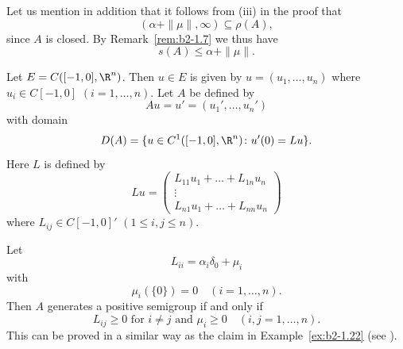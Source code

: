 Let us mention in addition that it follows from \upshape(iii) in the proof that 
%
\[
	(\alpha + \|\mu\|, \infty) \subseteq \rho(A) ,
\]
%
since $A$ is closed.
By Remark~\ref{rem:b2-1.7} we thus have
\begin{equation}\label{eq:b2-1.14}
s(A) \leq \alpha + \|\mu\|.
\end{equation}
\begin{example}\label{ex:b2-1.23}
Let $E = C([-1,0],\R^{n})$.
Then $u \in E$ is given by $u = (u_{1},\ldots,u_{n})$ where $u_{i} \in C[-1,0]$ $(i=1,\ldots,n)$.
Let $A$ be defined by 
%
\[
	Au = u' = (u_{1}',\ldots,u_{n}')
\]
% 
with domain 
%
\[
	D(A) = \{u \in C^{1}([-1,0],\R^{n}) \colon u'(0) = Lu\} .
\]
%
Here $L$ is defined by
\[
    Lu = \begin{pmatrix}
        L_{11}u_{1} + \ldots + L_{1n}u_{n} \\
        \vdots \\
        L_{n1}u_{1} + \ldots + L_{nn}u_{n}
    \end{pmatrix}
\]
where $L_{ij} \in C[-1,0]'$ $(1 \leq i,j \leq n)$.

Let 
%
\[
	 L_{ii} = \alpha_{i}\delta_{0} + \mu_{i}
\]
%
with
%
\[
	 \mu_{i}(\{0\}) = 0 \quad (i = 1, \ldots, n) .
\]
%
Then $A$ generates a positive semigroup if and only if 
\[
L_{ij} \geq 0 \text{ for } i \neq j \text{ and } \mu_{i} \geq 0 \quad (i,j = 1,\ldots,n) .
\]
This can be proved in a similar way as the claim in Example~\ref{ex:b2-1.22} 
(see \textcite{arendt:1984a}).
\end{example}

